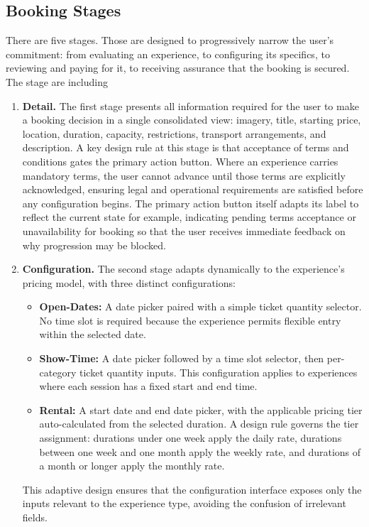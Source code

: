 \subsection{Booking Stages}
\label{subsection:Booking Stages}
There are five stages. Those are designed to progressively narrow the user's commitment: from evaluating an experience, to configuring its specifics, to reviewing and paying for it, to receiving assurance that the booking is secured. The stage are including
\begin{enumerate}
    \item \textbf{Detail.} The first stage presents all information required for the user to make a booking decision in a single consolidated view: imagery, title, starting price, location, duration, capacity, restrictions, transport arrangements, and description. A key design rule at this stage is that acceptance of terms and conditions gates the primary action button. Where an experience carries mandatory terms, the user cannot advance until those terms are explicitly acknowledged, ensuring legal and operational requirements are satisfied before any configuration begins. The primary action button itself adapts its label to reflect the current state for example, indicating pending terms acceptance or unavailability for booking so that the user receives immediate feedback on why progression may be blocked.

    \item \textbf{Configuration.} The second stage adapts dynamically to the experience's pricing model, with three distinct configurations:
    \begin{itemize}
        \item \textbf{Open-Dates:} A date picker paired with a simple ticket quantity selector. No time slot is required because the experience permits flexible entry within the selected date.
        \item \textbf{Show-Time:} A date picker followed by a time slot selector, then per-category ticket quantity inputs. This configuration applies to experiences where each session has a fixed start and end time.
        \item \textbf{Rental:} A start date and end date picker, with the applicable pricing tier auto-calculated from the selected duration. A design rule governs the tier assignment: durations under one week apply the daily rate, durations between one week and one month apply the weekly rate, and durations of a month or longer apply the monthly rate.
    \end{itemize}
    This adaptive design ensures that the configuration interface exposes only the inputs relevant to the experience type, avoiding the confusion of irrelevant fields.


\end{enumerate}
